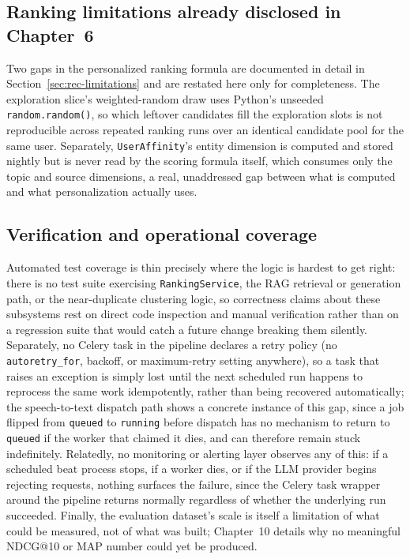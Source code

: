 \subsection{Ranking limitations already disclosed in Chapter~6}
\label{sec:disc-lim-ranking}

Two gaps in the personalized ranking formula are documented in detail in Section~\ref{sec:rec-limitations} and are restated here only for completeness. The exploration slice's weighted-random draw uses Python's unseeded \texttt{random.random()}, so which leftover candidates fill the exploration slots is not reproducible across repeated ranking runs over an identical candidate pool for the same user. Separately, \texttt{UserAffinity}'s entity dimension is computed and stored nightly but is never read by the scoring formula itself, which consumes only the topic and source dimensions, a real, unaddressed gap between what is computed and what personalization actually uses.

\subsection{Verification and operational coverage}
\label{sec:disc-lim-ops}

Automated test coverage is thin precisely where the logic is hardest to get right: there is no test suite exercising \texttt{RankingService}, the RAG retrieval or generation path, or the near-duplicate clustering logic, so correctness claims about these subsystems rest on direct code inspection and manual verification rather than on a regression suite that would catch a future change breaking them silently. Separately, no Celery task in the pipeline declares a retry policy (no \texttt{autoretry\_for}, backoff, or maximum-retry setting anywhere), so a task that raises an exception is simply lost until the next scheduled run happens to reprocess the same work idempotently, rather than being recovered automatically; the speech-to-text dispatch path shows a concrete instance of this gap, since a job flipped from \texttt{queued} to \texttt{running} before dispatch has no mechanism to return to \texttt{queued} if the worker that claimed it dies, and can therefore remain stuck indefinitely. Relatedly, no monitoring or alerting layer observes any of this: if a scheduled beat process stops, if a worker dies, or if the LLM provider begins rejecting requests, nothing surfaces the failure, since the Celery task wrapper around the pipeline returns normally regardless of whether the underlying run succeeded. Finally, the evaluation dataset's scale is itself a limitation of what could be measured, not of what was built; Chapter~10 details why no meaningful NDCG@10 or MAP number could yet be produced.

